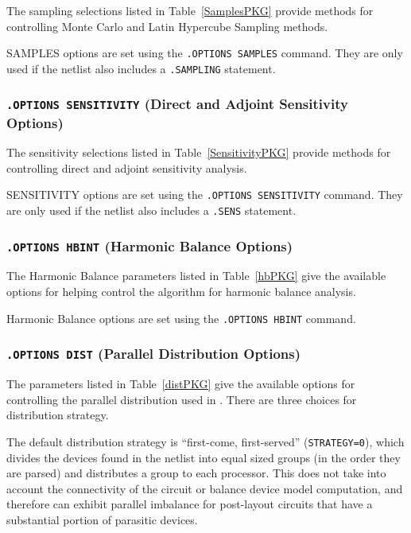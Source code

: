 The sampling selections listed in Table~\ref{SamplesPKG}
provide methods for controlling Monte Carlo and Latin Hypercube Sampling methods.

SAMPLES options are set using the \texttt{.OPTIONS SAMPLES} command. 
They are only used if the netlist also includes a \texttt{.SAMPLING} statement. 




\subsubsection{\texttt{.OPTIONS SENSITIVITY} (Direct and Adjoint Sensitivity Options)}

The sensitivity selections listed in Table~\ref{SensitivityPKG}
provide methods for controlling direct and adjoint sensitivity analysis.

SENSITIVITY options are set using the \texttt{.OPTIONS SENSITIVITY} command. 
They are only used if the netlist also includes a \texttt{.SENS} statement. 




\subsubsection{\texttt{.OPTIONS HBINT} (Harmonic Balance Options)}

The Harmonic Balance parameters listed in Table~\ref{hbPKG} give the available
options for helping control the algorithm for harmonic balance analysis.

Harmonic Balance options are set using the \texttt{.OPTIONS HBINT} command.



\subsubsection{\texttt{.OPTIONS DIST} (Parallel Distribution Options)}

The parameters listed in Table~\ref{distPKG} give the available
options for controlling the parallel distribution used in \Xyce{}.
There are three choices for distribution strategy.

The default distribution strategy is ``first-come, first-served''
(\texttt{STRATEGY=0}), which divides the devices found in the netlist
into equal sized groups (in the order they are parsed) and distributes
a group to each processor.  This does not take into account the
connectivity of the circuit or balance device model computation, and
therefore can exhibit parallel imbalance for post-layout circuits that
have a substantial portion of parasitic devices.

